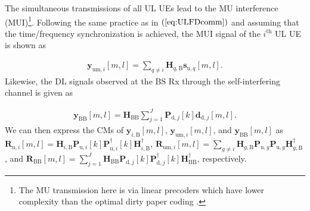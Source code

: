 \documentclass[10pt,journal]{IEEEtran}
\newcommand{\paren}[1]{\left({#1}\right)}
\newcommand{\bracket}[1]{{\left [{#1}\right ]}}
\newcommand{\ith}[1]    {{#1}^{\underline{\text{th}}}}
\newcommand{\PiB}{\mathbf{P}_{\textrm{u},i}\bracket{k}}
\newcommand{\PiBH}{\mathbf{P}^\dagger_{\textrm{u},i}\bracket{k}}
\newcommand{\PBj}{\mathbf{P}_{\textrm{d},j}\bracket{k}}
\newcommand{\PBjH}{\mathbf{P}^\dagger_{\textrm{d},j}\bracket{k}}
\newcommand{\HiB}{\mathbf{H}_{i,\textrm{B}}}
\newcommand{\HiBH}{\mathbf{H}^\dagger_{i,\textrm{B}}}
\theoremstyle{definition}
\begin{document}
	\color{black}
	The simultaneous transmissions of all UL UEs lead to the MU interference (MUI)\footnote{The MU transmission here is via linear precoders which have lower complexity than the optimal dirty paper coding \cite{tse2005fundamentals}.}. Following the same practice as in $\paren{\ref{eq:ULFDcomm}}$ and assuming that the time/frequency synchronization is achieved, the MUI signal of the $\ith{i}$ UL UE is shown as \par\noindent\small
	\begin{align}
		\mathbf{y}_{\textrm{um},i}\bracket{m,l}=\sum_{q\neq i}\mathbf{H}_{q,\textrm{B}}\mathbf{s}_{\textrm{u},q}\bracket{m,l}.\label{eq:mui}
	\end{align}\normalsize
	Likewise, the DL signals observed at the BS Rx through the self-interfering channel is given as \par\noindent\small \begin{align}
		\mathbf{y}_{\mathrm{BB}}\bracket{m,l}=\mathbf{H}_{\mathrm{BB}}\sum_{j=1}^{\mathit{J}}\PBj\mathbf{d}_{\mathrm{d},j}\bracket{m,l}. \label{eq:sic}
	\end{align}\normalsize
	We can then express the CMs of 
	$\mathbf{y}_{i,\textrm{B}}\bracket{m,l}$, $\mathbf{y}_{\textrm{um},i}\bracket{m,l}$,  and $\mathbf{y}_{\mathrm{BB}}\bracket{m,l}$ as  $\mathbf{R}_{\textrm{u},i}\bracket{m,l}=\HiB\PiB\PiBH\HiBH$,
	$\mathbf{R}_{\textrm{um},i}\bracket{m,l}=\sum_{g\neq i }\mathbf{H}_{g,\textrm{B}}\mathbf{P}_{\textrm{u},g}\mathbf{P}_{\textrm{u},g}\mathbf{H}^\dagger_{g,\textrm{B}}$, and $\mathbf{R}_{\mathrm{BB}}\bracket{m,l}=\sum_{j=1}^{\mathit{J}}\mathbf{H}_{\mathrm{BB}}\PBj\PBjH\mathbf{H}^\dagger_\mathrm{BB}$, respectively.
	
\end{document}
